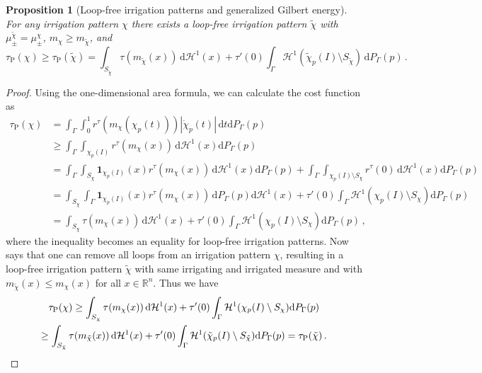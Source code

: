 \documentclass[10pt,a4paper,oneside,final]{article}
\newcommand{\R}{{\mathbb{R}}}
\newcommand{\de}{{\mathrm{d}}}
\newcommand{\setchar}[1]{\mathbf{1}_{#1}}
\newcommand{\hdone}{\mathcal{H}^1}
\newcommand{\reSpace}{\Gamma}
\newcommand{\reMeasure}{P_{\reSpace}}
\newcommand{\JEnMMS}[1][\tau]{#1_{\mathrm{P}}}%
\numberwithin{equation}{section}
\theoremstyle{plain}
\newtheorem{proposition}[theorem]{Proposition}
\theoremstyle{definition}
\theoremstyle{remark}
\begin{document}
\begin{proposition}[Loop-free irrigation patterns and generalized Gilbert energy]\label{thm:GilbertPatterns}
For any irrigation pattern $\chi$ there exists a loop-free irrigation pattern $\tilde\chi$ with $\mu_\pm^{\tilde\chi}=\mu_\pm^\chi$, $m_\chi\geq m_{\tilde\chi}$, and
\begin{equation*}
\JEnMMS(\chi)
\geq\JEnMMS(\tilde\chi)
=\int_{S_{\tilde\chi}}\tau(m_{\tilde\chi}(x))\,\de\hdone(x)+\tau'(0)\int_\reSpace\hdone(\tilde\chi_p(I)\setminus S_{\tilde\chi})\,\de\reMeasure(p)\,.
\end{equation*}
\end{proposition}
\begin{proof}
Using the one-dimensional area formula, we can calculate the cost function as
\begin{align*}
\JEnMMS(\chi)
&=\int_\reSpace\int_0^1r^\tau(m_\chi(\chi_p(t)))|\dot\chi_p(t)|\,\de t\de \reMeasure(p)\\
&\geq\int_\reSpace\int_{\chi_p(I)}r^\tau(m_\chi(x))\,\de\hdone(x)\de \reMeasure(p)\\
&=\int_\reSpace\int_{S_\chi}\setchar{\chi_p(I)}(x)r^\tau(m_\chi(x))\,\de\hdone(x)\de \reMeasure(p)
+\int_\reSpace\int_{\chi_p(I)\setminus S_\chi}r^\tau(0)\,\de\hdone(x)\de \reMeasure(p)\\
&=\int_{S_\chi}\int_\reSpace\setchar{\chi_p(I)}(x)r^\tau(m_\chi(x))\,\de \reMeasure(p)\de\hdone(x)
+\tau'(0)\int_\reSpace\hdone(\chi_p(I)\setminus S_\chi)\de \reMeasure(p)\\
&=\int_{S_\chi}\tau(m_\chi(x))\,\de\hdone(x)
+\tau'(0)\int_\reSpace\hdone(\chi_p(I)\setminus S_\chi)\de \reMeasure(p)\,,
\end{align*}
where the inequality becomes an equality for loop-free irrigation patterns.
Now \cite[Prop.\,4.6]{Bernot-Caselles-Morel-Traffic-Plans} says that one can remove all loops from an irrigation pattern $\chi$,
resulting in a loop-free irrigation pattern $\tilde\chi$ with same irrigating and irrigated measure and with $m_{\tilde\chi}(x)\leq m_{\chi}(x)$ for all $x\in\R^n$.
Thus we have
\begin{multline*}
\JEnMMS(\chi)
\geq\int_{S_\chi}\tau(m_\chi(x))\,\de\hdone(x)
+\tau'(0)\int_\reSpace\hdone(\chi_p(I)\setminus S_\chi)\de \reMeasure(p)\\
\geq\int_{S_{\tilde\chi}}\tau(m_{\tilde\chi}(x))\,\de\hdone(x)
+\tau'(0)\int_\reSpace\hdone(\tilde\chi_p(I)\setminus S_{\tilde\chi})\de \reMeasure(p)
=\JEnMMS(\tilde\chi)\,.\qedhere
\end{multline*}
\end{proof}
\end{document}
